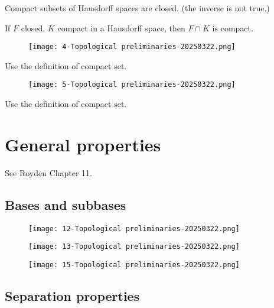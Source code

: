 \begin{corollary}
Compact subsets of Hausdorff spaces are closed. (the inverse is not true.)
\end{corollary}
\begin{corollary}
If $F$ closed, $K$ compact in a Hausdorff space, then $F\cap K$ is compact.
\end{corollary}
\begin{figure}[H]
\centering
\texttt{[image: 4-Topological preliminaries-20250322.png]}
\label{}
\end{figure}
Use the definition of compact set.

\begin{figure}[H]
\centering
\texttt{[image: 5-Topological preliminaries-20250322.png]}
\label{}
\end{figure}
Use the definition of compact set.

\section{General properties}

See Royden Chapter 11.

\subsection{Bases and subbases}

\begin{figure}[H]
\centering
\texttt{[image: 12-Topological preliminaries-20250322.png]}
\label{}
\end{figure}
\begin{figure}[H]
\centering
\texttt{[image: 13-Topological preliminaries-20250322.png]}
\label{}
\end{figure}
\begin{figure}[H]
\centering
\texttt{[image: 15-Topological preliminaries-20250322.png]}
\label{}
\end{figure}

\subsection{Separation properties}

